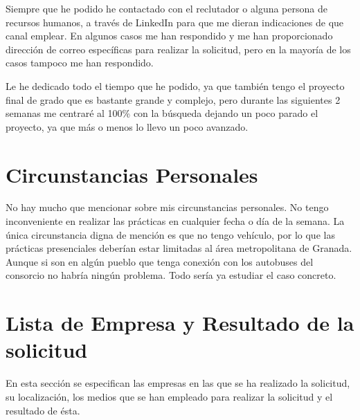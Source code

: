 Siempre que he podido he contactado con el reclutador o alguna persona de recursos humanos, a través de LinkedIn para que me dieran indicaciones de que canal emplear. En algunos casos me han respondido y me han proporcionado dirección de correo específicas para realizar la solicitud, pero en la mayoría de los casos tampoco me han respondido.

Le he dedicado todo el tiempo que he podido, ya que también tengo el proyecto final de grado que es bastante grande y complejo, pero durante las siguientes 2 semanas me centraré al 100\% con la búsqueda dejando un poco parado el proyecto, ya que más o menos lo llevo un poco avanzado.

\section{Circunstancias Personales}
No hay mucho que mencionar sobre mis circunstancias personales. No tengo inconveniente en realizar las prácticas en cualquier fecha o día de la semana. La única circunstancia digna de mención es que no tengo vehículo, por lo que las prácticas presenciales deberían estar limitadas al área metropolitana de Granada. Aunque si son en algún pueblo que tenga conexión con los autobuses del consorcio no habría ningún problema. Todo sería ya estudiar el caso concreto.

\section{Lista de Empresa y Resultado de la solicitud}
En esta sección se especifican las empresas en las que se ha realizado la solicitud, su localización, los medios que se han empleado para realizar la solicitud y el resultado de ésta.

